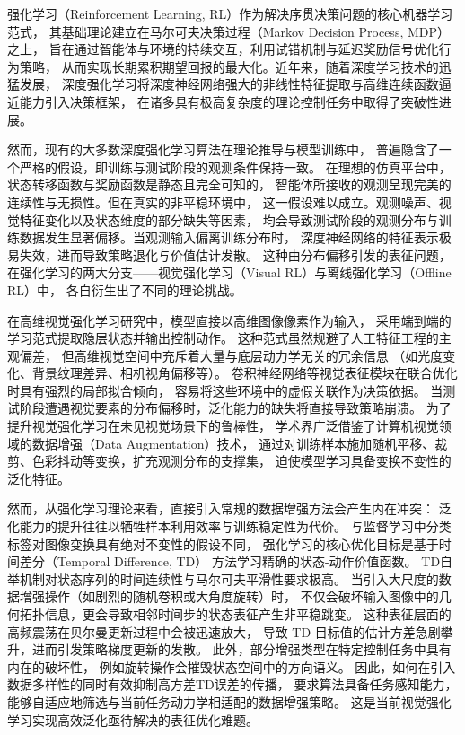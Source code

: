 


强化学习（Reinforcement Learning, RL）作为解决序贯决策问题的核心机器学习范式\cite{zheng2022application}，
其基础理论建立在马尔可夫决策过程（Markov Decision Process, MDP）\cite{gao2004survey}之上，
旨在通过智能体与环境的持续交互，利用试错机制与延迟奖励信号优化行为策略，
从而实现长期累积期望回报的最大化。近年来，随着深度学习\cite{lecun2015deep}技术的迅猛发展，
深度强化学习\cite{schulman2017proximal}将深度神经网络强大的非线性特征提取与高维连续函数逼近能力引入决策框架，
在诸多具有极高复杂度的理论控制任务中取得了突破性进展。

然而，现有的大多数深度强化学习算法在理论推导与模型训练中，
普遍隐含了一个严格的假设，即训练与测试阶段的观测条件保持一致。
在理想的仿真平台中，状态转移函数与奖励函数是静态且完全可知的，
智能体所接收的观测呈现完美的连续性与无损性。但在真实的非平稳环境中，
这一假设难以成立。观测噪声、视觉特征变化以及状态维度的部分缺失等因素，
均会导致测试阶段的观测分布与训练数据发生显著偏移。当观测输入偏离训练分布时，
深度神经网络的特征表示极易失效，进而导致策略退化与价值估计发散。
这种由分布偏移引发的表征问题，在强化学习的两大分支——视觉强化学习（Visual RL）与离线强化学习（Offline RL）中，
各自衍生出了不同的理论挑战。

在高维视觉强化学习研究中，模型直接以高维图像像素作为输入，
采用端到端的学习范式提取隐层状态并输出控制动作。
这种范式虽然规避了人工特征工程的主观偏差，
但高维视觉空间中充斥着大量与底层动力学无关的冗余信息
（如光度变化、背景纹理差异、相机视角偏移等）。
卷积神经网络等视觉表征模块在联合优化时具有强烈的局部拟合倾向，
容易将这些环境中的虚假关联作为决策依据\cite{zhang2018study}。
当测试阶段遭遇视觉要素的分布偏移时，泛化能力的缺失将直接导致策略崩溃。
为了提升视觉强化学习在未见视觉场景下的鲁棒性，
学术界广泛借鉴了计算机视觉领域的数据增强（Data Augmentation）技术，
通过对训练样本施加随机平移、裁剪、色彩抖动等变换，扩充观测分布的支撑集，
迫使模型学习具备变换不变性的泛化特征。

然而，从强化学习理论来看，直接引入常规的数据增强方法会产生内在冲突：
泛化能力的提升往往以牺牲样本利用效率与训练稳定性为代价。
与监督学习中分类标签对图像变换具有绝对不变性的假设不同，
强化学习的核心优化目标是基于时间差分（Temporal Difference, TD）
方法学习精确的状态-动作价值函数。
TD自举机制对状态序列的时间连续性与马尔可夫平滑性要求极高。
当引入大尺度的数据增强操作（如剧烈的随机卷积或大角度旋转）时，
不仅会破坏输入图像中的几何拓扑信息，更会导致相邻时间步的状态表征产生非平稳跳变。
这种表征层面的高频震荡在贝尔曼更新过程中会被迅速放大，
导致 TD 目标值的估计方差急剧攀升，进而引发策略梯度更新的发散。
此外，部分增强类型在特定控制任务中具有内在的破坏性，
例如旋转操作会摧毁状态空间中的方向语义。
因此，如何在引入数据多样性的同时有效抑制高方差TD误差的传播，
要求算法具备任务感知能力，能够自适应地筛选与当前任务动力学相适配的数据增强策略。
这是当前视觉强化学习实现高效泛化亟待解决的表征优化难题。


